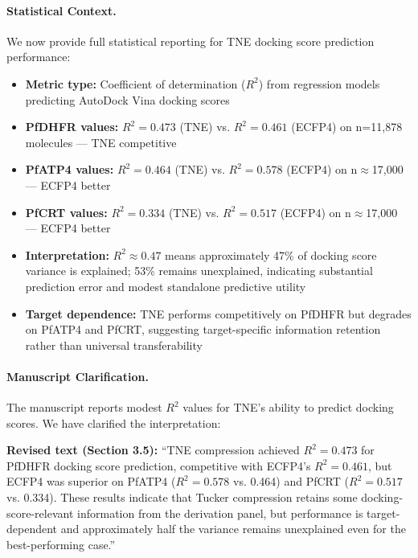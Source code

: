 \documentclass[11pt]{article}
\begin{document}
\paragraph{Statistical Context.}
We now provide full statistical reporting for TNE docking score prediction performance:
\begin{itemize}[leftmargin=1.6em]
\item \textbf{Metric type:} Coefficient of determination ($R^2$) from regression models 
predicting AutoDock Vina docking scores
\item \textbf{PfDHFR values:} $R^2=0.473$ (TNE) vs. $R^2=0.461$ (ECFP4) on n=11,878 molecules — 
TNE competitive
\item \textbf{PfATP4 values:} $R^2=0.464$ (TNE) vs. $R^2=0.578$ (ECFP4) on n$\approx$17,000 — 
ECFP4 better
\item \textbf{PfCRT values:} $R^2=0.334$ (TNE) vs. $R^2=0.517$ (ECFP4) on n$\approx$17,000 — 
ECFP4 better
\item \textbf{Interpretation:} $R^2 \approx 0.47$ means approximately 47\% of docking score 
variance is explained; 53\% remains unexplained, indicating substantial prediction error and 
modest standalone predictive utility
\item \textbf{Target dependence:} TNE performs competitively on PfDHFR but degrades on PfATP4 
and PfCRT, suggesting target-specific information retention rather than universal transferability
\end{itemize}

\paragraph{Manuscript Clarification.}
The manuscript reports modest $R^2$ values for TNE's ability to predict docking scores. 
We have clarified the interpretation:

\textbf{Revised text (Section 3.5):} ``TNE compression achieved $R^2=0.473$ for PfDHFR docking 
score prediction, competitive with ECFP4's $R^2=0.461$, but ECFP4 was superior on PfATP4 
($R^2=0.578$ vs. 0.464) and PfCRT ($R^2=0.517$ vs. 0.334). These results indicate that Tucker 
compression retains some docking-score-relevant information from the derivation panel, but 
performance is target-dependent and approximately half the variance remains unexplained even 
for the best-performing case.''
\end{document}

